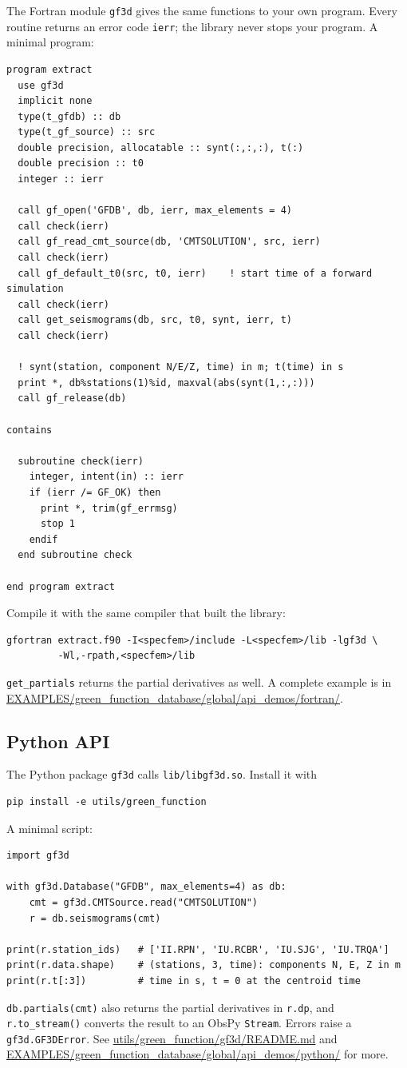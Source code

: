 The Fortran module \texttt{gf3d} gives the same functions to your own program.
Every routine returns an error code \texttt{ierr}; the library never stops
your program. A minimal program:
\begin{verbatim}
program extract
  use gf3d
  implicit none
  type(t_gfdb) :: db
  type(t_gf_source) :: src
  double precision, allocatable :: synt(:,:,:), t(:)
  double precision :: t0
  integer :: ierr

  call gf_open('GFDB', db, ierr, max_elements = 4)
  call check(ierr)
  call gf_read_cmt_source(db, 'CMTSOLUTION', src, ierr)
  call check(ierr)
  call gf_default_t0(src, t0, ierr)    ! start time of a forward simulation
  call check(ierr)
  call get_seismograms(db, src, t0, synt, ierr, t)
  call check(ierr)

  ! synt(station, component N/E/Z, time) in m; t(time) in s
  print *, db%stations(1)%id, maxval(abs(synt(1,:,:)))
  call gf_release(db)

contains

  subroutine check(ierr)
    integer, intent(in) :: ierr
    if (ierr /= GF_OK) then
      print *, trim(gf_errmsg)
      stop 1
    endif
  end subroutine check

end program extract
\end{verbatim}
Compile it with the same compiler that built the library:
\begin{verbatim}
gfortran extract.f90 -I<specfem>/include -L<specfem>/lib -lgf3d \
         -Wl,-rpath,<specfem>/lib
\end{verbatim}
\texttt{get\_partials} returns the partial derivatives as well. A complete
example is in
\url{EXAMPLES/green_function_database/global/api_demos/fortran/}.

\subsection{Python API}

The Python package \texttt{gf3d} calls \texttt{lib/libgf3d.so}. Install it with
\begin{verbatim}
pip install -e utils/green_function
\end{verbatim}
A minimal script:
\begin{verbatim}
import gf3d

with gf3d.Database("GFDB", max_elements=4) as db:
    cmt = gf3d.CMTSource.read("CMTSOLUTION")
    r = db.seismograms(cmt)

print(r.station_ids)   # ['II.RPN', 'IU.RCBR', 'IU.SJG', 'IU.TRQA']
print(r.data.shape)    # (stations, 3, time): components N, E, Z in m
print(r.t[:3])         # time in s, t = 0 at the centroid time
\end{verbatim}
\texttt{db.partials(cmt)} also returns the partial derivatives in
\texttt{r.dp}, and \texttt{r.to\_stream()} converts the result to an ObsPy
\texttt{Stream}. Errors raise a \texttt{gf3d.GF3DError}. See
\url{utils/green_function/gf3d/README.md} and
\url{EXAMPLES/green_function_database/global/api_demos/python/} for more.

